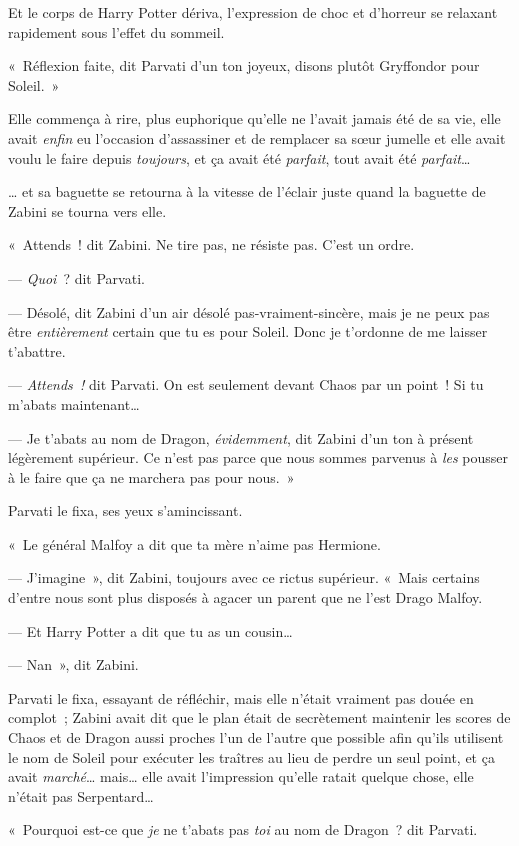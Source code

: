 Et le corps de Harry Potter dériva, l'expression de choc et d'horreur se relaxant rapidement sous l'effet du sommeil.

«~Réflexion faite, dit Parvati d'un ton joyeux, disons plutôt Gryffondor pour Soleil.~»

Elle commença à rire, plus euphorique qu'elle ne l'avait jamais été de sa vie, elle avait \emph{enfin} eu l'occasion d'assassiner et de remplacer sa sœur jumelle et elle avait voulu le faire depuis \emph{toujours}, et ça avait été \emph{parfait}, tout avait été \emph{parfait}…

… et sa baguette se retourna à la vitesse de l'éclair juste quand la baguette de Zabini se tourna vers elle.

«~Attends~! dit Zabini. Ne tire pas, ne résiste pas. C'est un ordre.

--- \emph{Quoi}~? dit Parvati.

--- Désolé, dit Zabini d'un air désolé pas-vraiment-sincère, mais je ne peux pas être \emph{entièrement} certain que tu es pour Soleil. Donc je t'ordonne de me laisser t'abattre.

--- \emph{Attends~!} dit Parvati. On est seulement devant Chaos par un point~! Si tu m'abats maintenant…

--- Je t'abats au nom de Dragon, \emph{évidemment}, dit Zabini d'un ton à présent légèrement supérieur. Ce n'est pas parce que nous sommes parvenus à \emph{les} pousser à le faire que ça ne marchera pas pour nous.~»

Parvati le fixa, ses yeux s'amincissant.

«~Le général Malfoy a dit que ta mère n'aime pas Hermione.

--- J'imagine~», dit Zabini, toujours avec ce rictus supérieur. «~Mais certains d'entre nous sont plus disposés à agacer un parent que ne l'est Drago Malfoy.

--- Et Harry Potter a dit que tu as un cousin…

--- Nan~», dit Zabini.

Parvati le fixa, essayant de réfléchir, mais elle n'était vraiment pas douée en complot~; Zabini avait dit que le plan était de secrètement maintenir les scores de Chaos et de Dragon aussi proches l'un de l'autre que possible afin qu'ils utilisent le nom de Soleil pour exécuter les traîtres au lieu de perdre un seul point, et ça avait \emph{marché}… mais… elle avait l'impression qu'elle ratait quelque chose, elle n'était pas Serpentard…

«~Pourquoi est-ce que \emph{je} ne t'abats pas \emph{toi} au nom de Dragon~? dit Parvati.

